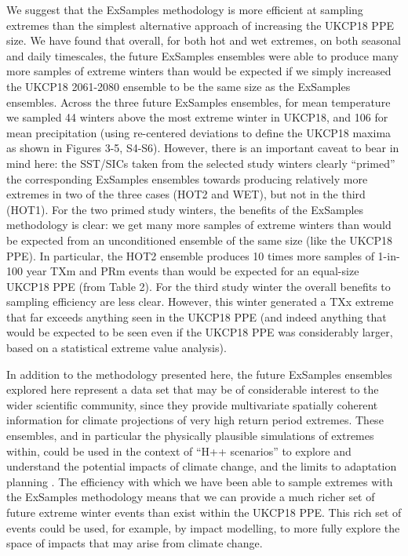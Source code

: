  We suggest that the ExSamples methodology is more efficient at sampling extremes than the simplest alternative approach of increasing the UKCP18 PPE size. We have found that overall, for both hot and wet extremes, on both seasonal and daily timescales, the future ExSamples ensembles were able to produce many more samples of extreme winters than would be expected if we simply increased the UKCP18 2061-2080 ensemble to be the same size as the ExSamples ensembles. Across the three future ExSamples ensembles, for mean temperature we sampled 44 winters above the most extreme winter in UKCP18, and 106 for mean precipitation (using re-centered deviations to define the UKCP18 maxima as shown in Figures 3-5, S4-S6). However, there is an important caveat to bear in mind here: the SST/SICs taken from the selected study winters clearly ``primed'' the corresponding ExSamples ensembles towards producing relatively more extremes in two of the three cases (HOT2 and WET), but not in the third (HOT1). For the two primed study winters, the benefits of the ExSamples methodology is clear: we get many more samples of extreme winters than would be expected from an unconditioned ensemble of the same size (like the UKCP18 PPE). In particular, the HOT2 ensemble produces 10 times more samples of 1-in-100 year TXm and PRm events than would be expected for an equal-size UKCP18 PPE (from Table 2). For the third study winter the overall benefits to sampling efficiency are less clear. However, this winter generated a TXx extreme that far exceeds anything seen in the UKCP18 PPE (and indeed anything that would be expected to be seen even if the UKCP18 PPE was considerably larger, based on a statistical extreme value analysis).
  
  In addition to the methodology presented here, the future ExSamples ensembles explored here represent a data set that may be of considerable interest to the wider scientific community, since they provide multivariate spatially coherent information for climate projections of very high return period extremes. These ensembles, and in particular the physically plausible simulations of extremes within, could be used in the context of ``H++ scenarios'' to explore and understand the potential impacts of climate change, and the limits to adaptation planning \citep{wade_developing_2015}. The efficiency with which we have been able to sample extremes with the ExSamples methodology means that we can provide a much richer set of future extreme winter events than exist within the UKCP18 PPE. This rich set of events could be used, for example, by impact modelling, to more fully explore the space of impacts that may arise from climate change.
  
